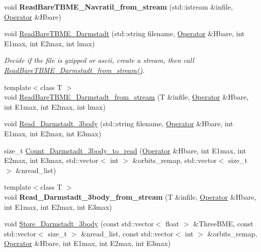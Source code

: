 \begin{DoxyCompactItemize}
\item 
\mbox{\label{classReadWrite_a258c666949b15835e379a1ed54a79e4a}} 
void {\bfseries Read\+Bare\+T\+B\+M\+E\+\_\+\+Navratil\+\_\+from\+\_\+stream} (std\+::istream \&infile, \hyperlink{classOperator}{Operator} \&Hbare)
\item 
\mbox{\label{classReadWrite_a7b803218b2f6f06fb3702f820cda8314}} 
void \hyperlink{classReadWrite_a7b803218b2f6f06fb3702f820cda8314}{Read\+Bare\+T\+B\+M\+E\+\_\+\+Darmstadt} (std\+::string filename, \hyperlink{classOperator}{Operator} \&Hbare, int E1max, int E2max, int lmax)
\begin{DoxyCompactList}\small\item\em Decide if the file is gzipped or ascii, create a stream, then call \hyperlink{classReadWrite_a44acf6835321a8bee6a795523728da2e}{Read\+Bare\+T\+B\+M\+E\+\_\+\+Darmstadt\+\_\+from\+\_\+stream()}. \end{DoxyCompactList}\item 
{\footnotesize template$<$class T $>$ }\\void \hyperlink{classReadWrite_a44acf6835321a8bee6a795523728da2e}{Read\+Bare\+T\+B\+M\+E\+\_\+\+Darmstadt\+\_\+from\+\_\+stream} (T \&infile, \hyperlink{classOperator}{Operator} \&Hbare, int E1max, int E2max, int lmax)
\item 
void \hyperlink{classReadWrite_a5718d535d7e865cb16229cb5c7f8b16d}{Read\+\_\+\+Darmstadt\+\_\+3body} (std\+::string filename, \hyperlink{classOperator}{Operator} \&Hbare, int E1max, int E2max, int E3max)
\item 
size\+\_\+t \hyperlink{classReadWrite_a636e7da4d6fc6a96136afdbf61dddaba}{Count\+\_\+\+Darmstadt\+\_\+3body\+\_\+to\+\_\+read} (\hyperlink{classOperator}{Operator} \&Hbare, int E1max, int E2max, int E3max, std\+::vector$<$ int $>$ \&orbits\+\_\+remap, std\+::vector$<$ size\+\_\+t $>$ \&nread\+\_\+list)
\item 
\mbox{\label{classReadWrite_af229332b05276f686966fdaaa98a81fd}} 
{\footnotesize template$<$class T $>$ }\\void {\bfseries Read\+\_\+\+Darmstadt\+\_\+3body\+\_\+from\+\_\+stream} (T \&infile, \hyperlink{classOperator}{Operator} \&Hbare, int E1max, int E2max, int E3max)
\item 
void \hyperlink{classReadWrite_a8c1bcfaf580336f44afe3c794029f678}{Store\+\_\+\+Darmstadt\+\_\+3body} (const std\+::vector$<$ float $>$ \&Three\+B\+ME, const std\+::vector$<$ size\+\_\+t $>$ \&nread\+\_\+list, const std\+::vector$<$ int $>$ \&orbits\+\_\+remap, \hyperlink{classOperator}{Operator} \&Hbare, int E1max, int E2max, int E3max)

\end{DoxyCompactItemize}
